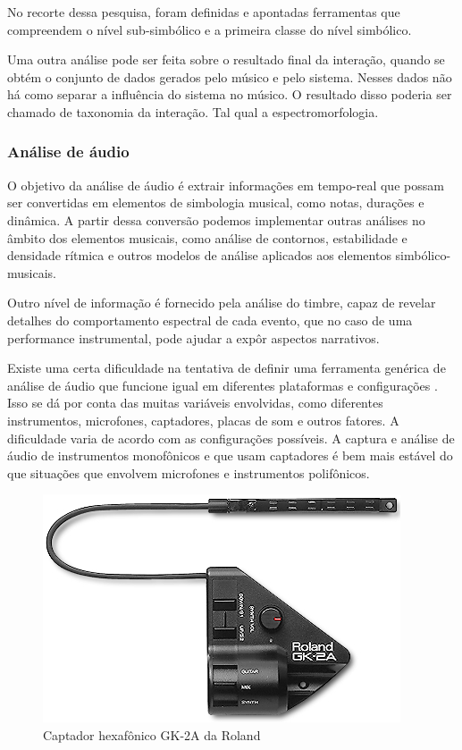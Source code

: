 \documentclass{ppgmus}
\begin{document}
No recorte dessa pesquisa, foram definidas e apontadas ferramentas que compreendem o nível
sub-simbólico e a primeira classe do nível simbólico. 


Uma outra análise pode ser feita sobre o resultado final da interação, quando se obtém
o conjunto de dados gerados pelo músico e pelo sistema. Nesses dados não há como separar
a influência do sistema no músico. O resultado disso poderia ser chamado de taxonomia 
da interação. Tal qual a espectromorfologia.


\subsubsection{Análise de áudio}


O objetivo da análise de áudio é extrair informações em tempo-real
que possam ser convertidas em elementos de simbologia musical, como notas, durações e dinâmica.
A partir dessa conversão podemos implementar outras análises no 
âmbito dos elementos musicais, como análise de contornos, estabilidade e 
densidade rítmica e outros modelos de análise aplicados aos elementos
simbólico-musicais. 

Outro nível de informação é fornecido pela análise do timbre, capaz
de revelar detalhes do comportamento espectral de cada evento, que no caso de uma 
performance instrumental, pode ajudar a expôr aspectos narrativos.

Existe uma certa dificuldade na tentativa de definir uma ferramenta genérica de análise de áudio 
que funcione igual em diferentes plataformas e configurações .
Isso se dá por conta das muitas variáveis envolvidas, como diferentes instrumentos, microfones, 
captadores, placas de som e outros fatores.
A dificuldade varia de acordo com as configurações possíveis. A captura e análise de áudio
 de instrumentos monofônicos e que usam captadores é bem mais estável
do que situações que envolvem microfones e instrumentos polifônicos.

\begin{figure}
\includegraphics[scale=.5]{gk-2a}
\caption{Captador hexafônico GK-2A da Roland}
\label{gk-2a}
\end{figure} 
\end{document}
